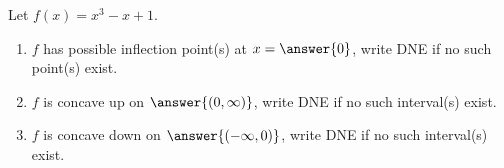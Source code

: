 \documentclass{ximera}
\author{Gregory Hartman \and Matthew Carr}
\begin{document}
\begin{exercise}




Let $f(x)=x^3-x+1$. 
\begin{enumerate}
\item		$f$ has possible inflection point(s) at $x=\answer{0}$, write DNE if no such point(s) exist.
\item		$f$ is concave up on $\answer{(0,\infty)}$, write DNE if no such interval(s) exist.
\item		$f$ is concave down on $\answer{(-\infty,0)}$, write DNE if no such interval(s) exist.
\end{enumerate}

\end{exercise}
\end{document}
